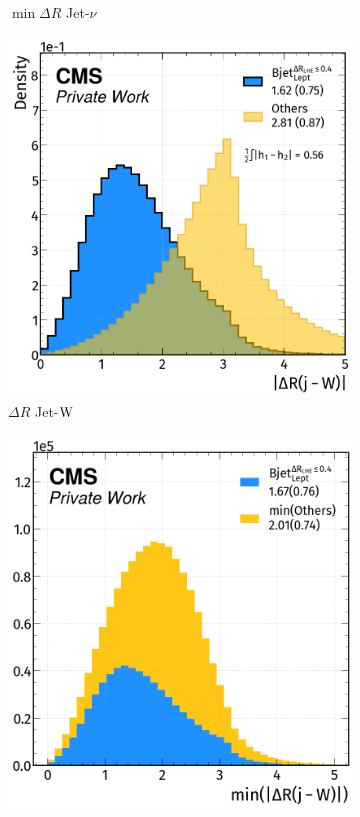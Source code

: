 \begin{figure}[H]
\begin{subfigure}{0.4775\linewidth}
        \caption{$\min \Delta R$ Jet-$\nu$}
    \end{subfigure}  
    \hfill
    \begin{subfigure}{0.49\linewidth}
        \centering
        \includegraphics[width=1\linewidth]{fig//chap08-kin_reco/dr_W.png}
        \caption{$\Delta R$ Jet-${\text{W}}$}
    \end{subfigure}
    \hfill
    \begin{subfigure}{0.475\linewidth}  
        \centering
        \includegraphics[width=1\linewidth]{fig//chap08-kin_reco/min_dr_W.png}

\end{subfigure}
\end{figure}
